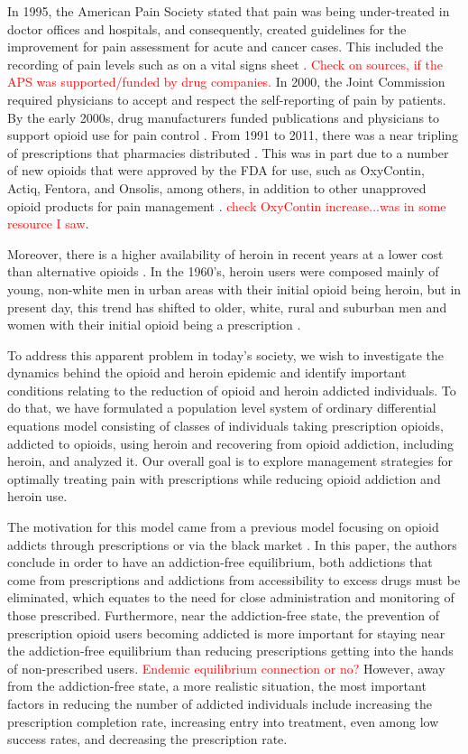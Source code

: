 \documentclass[12pt]{article}
\begin{document}
In 1995, the American Pain Society stated that pain was being under-treated in doctor offices and hospitals, and consequently, created guidelines for the improvement for pain assessment for acute and cancer cases. This included the recording of pain levels such as on a vital signs sheet \cite{Mandell} \cite{Max}. \textcolor{red}{Check on sources, if the APS was supported/funded by drug companies.} In 2000, the Joint Commission required physicians to accept and respect the self-reporting of pain by patients. By the early 2000s, drug manufacturers funded publications and physicians to support opioid use for pain control \cite{Mandell}. From 1991 to 2011, there was a near tripling of prescriptions that pharmacies distributed \cite{NIDA1}. This was in part due to a number of new opioids that were approved by the FDA for use, such as OxyContin, Actiq, Fentora, and Onsolis, among others, in addition to other unapproved opioid products for pain management \cite{FDA1}. \textcolor{red}{check OxyContin increase...was in some resource I saw}. 

Moreover, there is a higher availability of heroin in recent years at a lower cost than alternative opioids \cite{NIDA1}. In the 1960's, heroin users were composed mainly of young, non-white men in urban areas with their initial opioid being heroin, but in present day, this trend has shifted to older, white, rural and suburban men and women with their initial opioid being a prescription \cite{NIDA1}. 

To address this apparent problem in today's society, we wish to investigate the dynamics behind the opioid and heroin epidemic and identify important conditions relating to the reduction of opioid and heroin addicted individuals. To do that, we have formulated a population level system of ordinary differential equations model consisting of classes of individuals taking prescription opioids, addicted to opioids, using heroin and recovering from opioid addiction, including heroin, and analyzed it. Our overall goal is to explore management strategies for optimally treating pain with prescriptions while reducing opioid addiction and heroin use. 

The motivation for this model came from a previous model focusing on opioid addicts through prescriptions or via the black market \cite{Battista}. In this paper, the authors conclude in order to have an addiction-free equilibrium, both addictions that come from prescriptions and addictions from accessibility to excess drugs must be eliminated, which equates to the need for close administration and monitoring of those prescribed. Furthermore, near the addiction-free state, the prevention of prescription opioid users becoming addicted is more important for staying near the addiction-free equilibrium than reducing prescriptions getting into the hands of non-prescribed users. \textcolor{red}{Endemic equilibrium connection or no?} However, away from the addiction-free state, a more realistic situation, the most important factors in reducing the number of addicted individuals include increasing the prescription completion rate, increasing entry into treatment, even among low success rates, and decreasing the prescription rate. 
\end{document}
